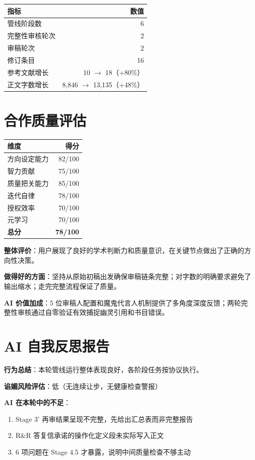 \documentclass[12pt,a4paper]{article}
\begin{document}
\begin{tabular}{lr}
\hline
\textbf{指标} & \textbf{数值} \\
\hline
管线阶段数 & 6 \\
完整性审核轮次 & 2 \\
审稿轮次 & 2 \\
修订条目 & 16 \\
参考文献增长 & 10 $\rightarrow$ 18（+80\%） \\
正文字数增长 & 8,846 $\rightarrow$ 13,135（+48\%） \\
\hline
\end{tabular}

\section{合作质量评估}

\begin{tabular}{lr}
\hline
\textbf{维度} & \textbf{得分} \\
\hline
方向设定能力 & 82/100 \\
智力贡献 & 75/100 \\
质量把关能力 & 85/100 \\
迭代自律 & 78/100 \\
授权效率 & 70/100 \\
元学习 & 70/100 \\
\hline
\textbf{总分} & \textbf{78/100} \\
\hline
\end{tabular}

\textbf{整体评价}：用户展现了良好的学术判断力和质量意识，在关键节点做出了正确的方向性决策。

\textbf{做得好的方面}：坚持从原始初稿出发确保审稿链条完整；对字数的明确要求避免了输出缩水；走完完整流程保证了质量。

\textbf{AI 价值加成}：5 位审稿人配置和魔鬼代言人机制提供了多角度深度反馈；两轮完整性审核通过自零验证有效捕捉幽灵引用和书目错误。

\section{AI 自我反思报告}

\textbf{行为总结}：本轮管线运行整体表现良好，各阶段任务按协议执行。

\textbf{谄媚风险评估}：低（无连续让步，无健康检查警报）

\textbf{AI 在本轮中的不足}：
\begin{enumerate}
    \item Stage 3' 再审结果呈现不完整，先给出汇总表而非完整报告
    \item R\&R 答复信承诺的操作化定义段未实际写入正文
    \item 6 项问题在 Stage 4.5 才暴露，说明中间质量检查不够主动
\end{enumerate}
\end{document}
